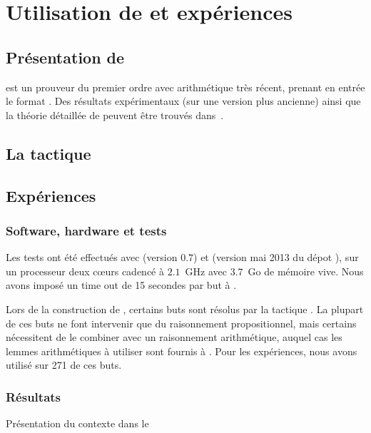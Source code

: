 \section{Utilisation de \beagle et expériences}
\label{sec:experiences}

\subsection{Présentation de \beagle}
\beagle est un prouveur du premier ordre avec arithmétique très récent,
prenant en entrée le format \tff. Des résultats expérimentaux (sur une
version plus ancienne) ainsi que la théorie détaillée de \beagle peuvent être trouvés dans~\cite{DBLP:conf/cade/BaumgartnerW13}.


\subsection{La tactique \beagletac}
\label{sec:experiences:beagletac}



\subsection{Expériences}
\label{sec:experiences:experiences}

\subsubsection{Software, hardware et tests}
Les tests ont été effectués avec \beagle (version $0.7$) et \holfour (version mai 2013 du dépot ), sur un processeur deux cœurs cadencé à $2.1$~GHz avec $3.7$~Go de mémoire vive. 
Nous avons imposé un time out de 15 secondes par but à \beagle.
 
Lors de la construction de \holfour, certains buts sont résolus par la
tactique \metistac. La plupart de ces buts ne font intervenir que du
raisonnement propositionnel, mais certains nécessitent de le combiner
avec un raisonnement arithmétique, auquel cas les lemmes arithmétiques à
utiliser sont fournis à \metistac. Pour les expériences, nous avons
utilisé \beagletac sur 271 de ces buts.


\subsubsection{Résultats}

Présentation du contexte dans le

